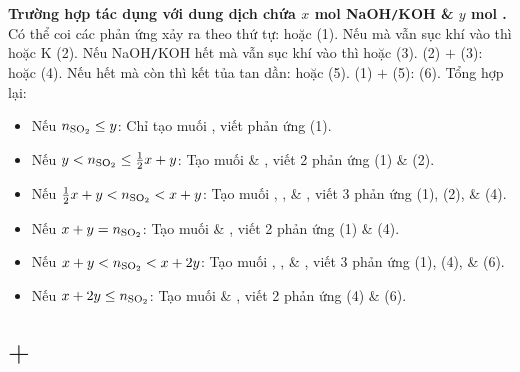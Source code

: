 \documentclass{article}
\begin{document}
\noindent\textbf{\textsf{Trường hợp  tác dụng với dung dịch chứa $x$ mol {\rm NaOH}{\tt/}KOH \& $y$ mol .}} Có thể coi các phản ứng xảy ra theo thứ tự:  hoặc  (1). Nếu  mà vẫn sục khí  vào thì  hoặc K (2). Nếu NaOH{\tt/}KOH hết mà vẫn sục khí  vào thì  hoặc  (3). (2) $+$ (3):  hoặc  (4). Nếu  hết mà  còn thì kết tủa tan dần:  hoặc  (5). (1) $+$ (5):  (6). Tổng hợp lại:
\begin{itemize}
	\item Nếu $n_{\ce{SO2}}\le y$: Chỉ tạo muối , viết phản ứng (1).
	\item Nếu $y < n_{\ce{SO2}}\le\frac{1}{2}x + y$: Tạo muối  \& , viết 2 phản ứng (1) \& (2).
	\item Nếu $\frac{1}{2}x + y < n_{\ce{SO2}} < x + y$: Tạo muối , , \& , viết 3 phản ứng (1), (2), \& (4).
	\item Nếu $x + y = n_{\ce{SO2}}$: Tạo muối  \& , viết 2 phản ứng (1) \& (4).
	\item Nếu $x + y < n_{\ce{SO2}} < x + 2y$: Tạo muối , , \& , viết 3 phản ứng (1), (4), \& (6).
	\item Nếu $x + 2y\le n_{\ce{SO2}}$: Tạo muối  \& , viết 2 phản ứng (4) \& (6).
\end{itemize}






\section{ $+$ }

\end{document}
